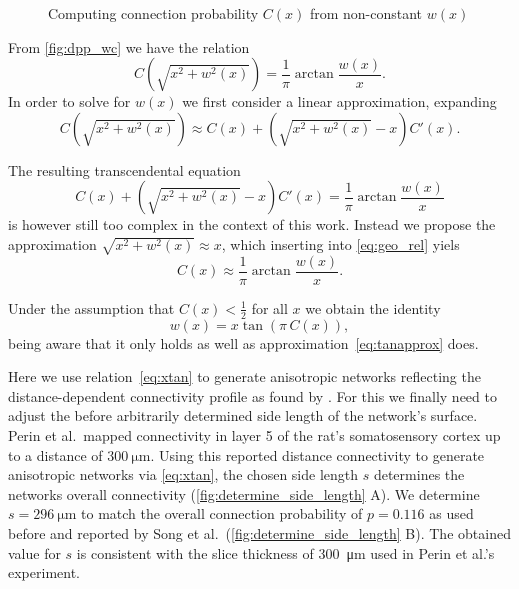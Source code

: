 \begin{figure}[htp]
  \centering
  \caption{Computing connection probability $C(x)$ from non-constant $w(x)$}
  \label{fig:dpp_wc}
\end{figure}

From \autoref{fig:dpp_wc} we have the relation  
\begin{equation}
C\left(\sqrt{x^2+w^2(x)}\right) = \frac{1}{\pi} \operatorname{arctan}
\frac{w(x)}{x}. \label{eq:geo_rel}
\end{equation} 
In order to solve for $w(x)$ we first consider a linear approximation,
expanding
\[C\left(\sqrt{x^2+w^2(x)}\right) \approx C(x) + \left(\sqrt{x^2+w^2(x)} -
x\right) C'(x).\]

The resulting transcendental equation
\[C(x) + \left(\sqrt{x^2+w^2(x)} -
x\right) C'(x) = \frac{1}{\pi} \operatorname{arctan}
\frac{w(x)}{x}\]
is however still too complex in the context of this work. Instead we
propose the approximation $\sqrt{x^2 + w^2(x)} \approx  x$, which
inserting into \ref{eq:geo_rel} yiels
\begin{equation}
C(x) \approx \frac{1}{\pi} \operatorname{arctan} \label{eq:tanapprox}
\frac{w(x)}{x}.
\end{equation}

Under the assumption that $C(x)<\frac{1}{2}$ for all $x$ we obtain the
identity
\begin{equation}
  w(x) = x \tan\left( \pi\, C(x) \right), \label{eq:xtan}
\end{equation} 
being aware that it only holds as well as
approximation~\ref{eq:tanapprox} does. 

Here we use relation~\ref{eq:xtan} to generate anisotropic networks
reflecting the dis\-tance-de\-pendent connectivity profile as found by
\textcite{Perin2011}. For this we finally need to adjust the before
arbitrarily determined side length of the network's surface. Perin et
al.~mapped connectivity in layer 5 of the rat's somatosensory cortex
up to a distance of $\SI{300}{\micro\meter}$. Using this reported
distance connectivity to generate anisotropic networks via
\ref{eq:xtan}, the chosen side length $s$ determines the networks
overall connectivity (\autoref{fig:determine_side_length} A). We
determine $s = \SI{296}{\micro\meter}$ to match the overall connection
probability of $p = 0.116$ as used before and reported by Song et
al.~(\autoref{fig:determine_side_length} B). The obtained value for
$s$ is consistent with the slice thickness of \SI{300}{\micro\meter}
used in Perin et al.'s experiment.


